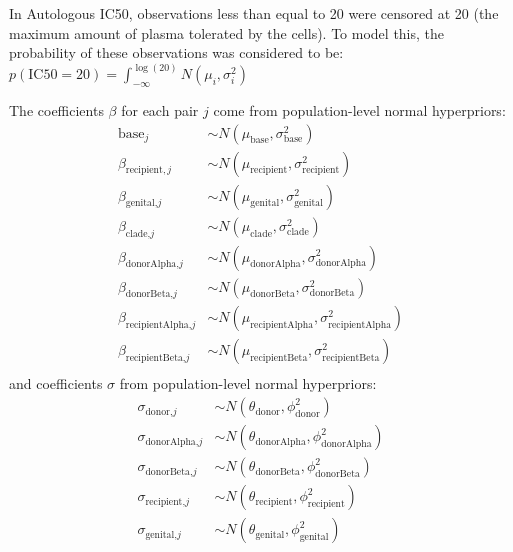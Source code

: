 \documentclass[12pt]{article}
\begin{document}
In Autologous IC50, observations less than equal to 20 were censored at 20 (the maximum amount of plasma tolerated by the cells). To model this, the probability of these observations was considered to be:
\(p(\text{IC50}=20)=\int_{-\infty}^{\log(20)}N(\mu_i,\sigma^2_i)\)

The coefficients $\beta$ for each pair $j$ come from population-level normal hyperpriors:
\begin{align*}
\text{base}_{j} & \sim  N(\mu_{\text{base}},\sigma^2_{\text{base}})\\
\beta_{\text{recipient},j} & \sim  N(\mu_{\text{recipient}},\sigma^2_{\text{recipient}})\\
\beta_{\text{genital,}j} & \sim  N(\mu_{\text{genital}},\sigma^2_{\text{genital}})\\
\beta_{\text{clade,}j} & \sim  N(\mu_{\text{clade}},\sigma^2_{\text{clade}}) \\
\beta_{\text{donorAlpha,}j} & \sim  N(\mu_{\text{donorAlpha}},\sigma^2_{\text{donorAlpha}}) \\
\beta_{\text{donorBeta,}j} & \sim  N(\mu_{\text{donorBeta}},\sigma^2_{\text{donorBeta}}) \\
\beta_{\text{recipientAlpha,}j} & \sim  N(\mu_{\text{recipientAlpha}},\sigma^2_{\text{recipientAlpha}}) \\
\beta_{\text{recipientBeta,}j} & \sim  N(\mu_{\text{recipientBeta}},\sigma^2_{\text{recipientBeta}}) \\
\end{align*}
and coefficients $\sigma$ from population-level normal hyperpriors:
\begin{align*}
\sigma_{\text{donor,}j} & \sim  N(\theta_\text{donor},\phi^2_\text{donor})\\
\sigma_{\text{donorAlpha,}j} & \sim  N(\theta_\text{donorAlpha},\phi^2_\text{donorAlpha})\\
\sigma_{\text{donorBeta,}j} & \sim  N(\theta_\text{donorBeta},\phi^2_\text{donorBeta})\\
\sigma_{\text{recipient,}j} & \sim  N(\theta_\text{recipient},\phi^2_\text{recipient})\\
\sigma_{\text{genital,}j} & \sim  N(\theta_\text{genital},\phi^2_\text{genital})\\
\end{align*}
\end{document}
